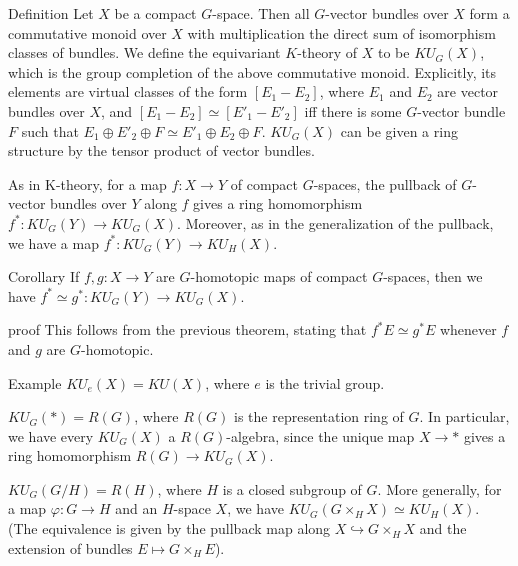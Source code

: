 \documentclass{beamer}
\newcommand{\inj}{\hookrightarrow}
\begin{document}
\begin{frame}
	\begin{block}{Definition}
		Let $X$ be a compact $G$-space. Then all $G$-vector bundles over $X$ form a commutative monoid over $X$ with multiplication the direct sum of isomorphism classes of bundles. We define the equivariant $K$-theory of $X$ to be $KU_G(X)$, which is the group completion of the above commutative monoid. Explicitly, its elements are virtual classes of the form $[E_1-E_2]$, where $E_1$ and $E_2$ are vector bundles over $X$, and $[E_1-E_2]\simeq[E'_1-E'_2]$ iff there is some $G$-vector bundle $F$ such that $E_1\oplus E'_2\oplus F\simeq E'_1\oplus E_2\oplus F$. $KU_G(X)$ can be given a ring structure by the tensor product of vector bundles. 

		As in K-theory, for a map $f:X\to Y$ of compact $G$-spaces, the pullback of $G$-vector bundles over $Y$ along $f$ gives a ring homomorphism $f^*:KU_G(Y)\to KU_G(X)$. Moreover, as in the generalization of the pullback, we have a map $f^*:KU_G(Y)\to KU_H(X)$. 
	\end{block}
\end{frame}

\begin{frame}
	\begin{block}{Corollary}
		If $f,g:X\to Y$ are $G$-homotopic maps of compact $G$-spaces, then we have $f^*\simeq g^*:KU_G(Y)\to KU_G(X)$. 
	\end{block}
	\begin{block}{proof}
		This follows from the previous theorem, stating that $f^*E\simeq g^*E$ whenever $f$ and $g$ are $G$-homotopic. 
	\end{block}
\end{frame}

\begin{frame}
	\begin{block}{Example}
		$KU_e(X)=KU(X)$, where $e$ is the trivial group. 

		$KU_G(*)=R(G)$, where $R(G)$ is the representation ring of $G$. In particular, we have every $KU_G(X)$ a $R(G)$-algebra, since the unique map $X\to *$ gives a ring homomorphism $R(G)\to KU_G(X)$. 

		$KU_G(G/H)=R(H)$, where $H$ is a closed subgroup of $G$. More generally, for a map $\varphi:G\to H$ and an $H$-space $X$, we have $KU_G(G\times_HX)\simeq KU_H(X)$. (The equivalence is given by the pullback map along $X\inj G\times_HX$ and the extension of bundles $E\mapsto G\times_HE$). 
	\end{block}
\end{frame}
\end{document}

